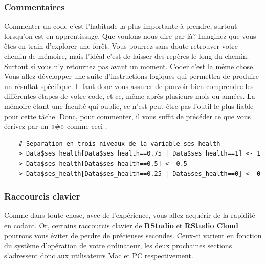 \documentclass[10.5pt,a4paper]{article}
\begin{document}
    \subsubsection{Commentaires}
    
    Commenter un code c'est l'habitude la plus importante à prendre, surtout lorsqu'on est en apprentissage. Que voulons-nous dire par là? Imaginez que vous êtes en train d'explorer une forêt. Vous pourrez sans doute retrouver votre chemin de mémoire, mais l'idéal c'est de laisser des repères le long du chemin. Surtout si vous n'y retournez pas avant un moment. Coder c'est la même chose. Vous allez développer une suite d'instructions logiques qui permettra de produire un résultat spécifique. Il faut donc vous assurer de pouvoir bien comprendre les différentes étapes de votre code, et ce, même après plusieurs mois ou années. La mémoire étant une faculté qui oublie, ce n'est peut-être pas l'outil le plus fiable pour cette tâche. Donc, pour commenter, il vous suffit de précéder ce que vous écrivez par un «$\#$» comme ceci :
    
    \begin{lstlisting}
    # Separation en trois niveaux de la variable ses_health
    > Data$ses_health[Data$ses_health==0.75 | Data$ses_health==1] <- 1 
    > Data$ses_health[Data$ses_health==0.5] <- 0.5
    > Data$ses_health[Data$ses_health==0.25 | Data$ses_health==0] <- 0
    \end{lstlisting}
    
    \subsubsection{Raccourcis clavier}
    
    Comme dans toute chose, avec de l'expérience, vous allez acquérir de la rapidité en codant. Or, certains raccourcis clavier de \textbf{RStudio} et \textbf{RStudio Cloud} pourrons vous éviter de perdre de précieuses secondes. Ceux-ci varient en fonction du système d'opération de votre ordinateur, les deux prochaines sections s'adressent donc aux utilisateurs Mac et PC respectivement. 
    
\end{document}
